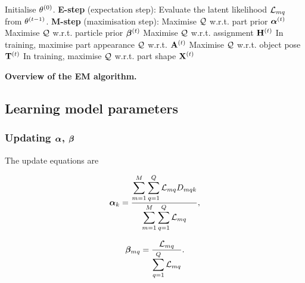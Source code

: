 \begin{algorithm} 
	\begin{algorithmic}
		\STATE Initialise $\theta^{(0)}$.
		\REPEAT
		\STATE \textbf{E-step} (expectation step): 
		\STATE \hspace{\algorithmicindent} Evaluate the latent likelihood $\mathcal{L}_{mq}$ from $\theta^{(t-1)}$.   
		\STATE \textbf{M-step} (maximisation step): 
		\STATE \hspace{\algorithmicindent} Maximise $\mathcal{Q}$ w.r.t. part prior $\bm{\alpha}^{(t)}$
		\STATE \hspace{\algorithmicindent} Maximise $\mathcal{Q}$ w.r.t. particle prior $\bm{\beta}^{(t)}$
		\STATE \hspace{\algorithmicindent} Maximise $\mathcal{Q}$ w.r.t. assignment $\mathbf{H}^{(t)}$
		\STATE \hspace{\algorithmicindent} In training, maximise part appearance $\mathcal{Q}$ w.r.t. $\mathbf{A}^{(t)}$ 
		\STATE \hspace{\algorithmicindent} Maximise $\mathcal{Q}$ w.r.t. object pose $\mathbf{T}^{(t)}$
		\STATE \hspace{\algorithmicindent} In training, maximise $\mathcal{Q}$ w.r.t. part shape $\mathbf{X}^{(t)}$
	\end{algorithmic}
	\caption{\textbf{Overview of the EM algorithm.}}
	\label{algo/reg/em}
\end{algorithm} 

\subsection{Learning model parameters} 

\subsubsection{Updating $\bm{\alpha}$, $\bm{\beta}$}  The update equations are

\begin{equation}
	\bm{\alpha}_{k} = \frac{\displaystyle\sum_{m=1}^M \sum_{q = 1}^{Q} \mathcal{L}_{mq}{D}_{mqk}}{\displaystyle\sum_{m=1}^M \sum_{q = 1}^{Q} \mathcal{L}_{mq}}, 
\end{equation}

\begin{equation}
\bm{\beta}_{mq} = 
\frac{\mathcal{L}_{mq}}{\displaystyle\sum_{q = 1}^{Q} \mathcal{L}_{mq}}.
\end{equation}

